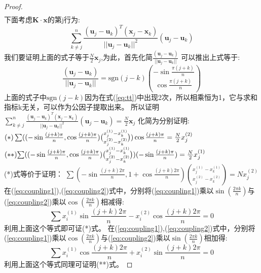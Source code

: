 \begin{proof}
\begin{eqnarray}
\end{eqnarray}
下面考虑$\bm{K}\cdot \bm{x}$的第j行为:
\begin{equation}\label{eq:tt}
\sum_{k\neq j}^n \frac{(\bm{u}_j-\bm{u}_k)^T(\bm{x}_j-\bm{x}_k)}{||\bm{u}_j-\bm{u}_k||^2}(\bm{u}_j-\bm{u}_k)
\end{equation}
我们要证明上面的式子等于$\frac{N}{2}\bm{x}_j$,为此，首先化简$\frac{(\bm{u}_j-\bm{u}_k)}{||\bm{u}_j-\bm{u}_k||}$
可以推出上式等于:
\begin{equation}
\frac{(\bm{u}_j-\bm{u}_k)}{||\bm{u}_j-\bm{u}_k||}=\text{sgn}(j-k)\binom{-\sin\frac{\pi(j+k)}{n}}{\cos\frac{\pi(j+k)}{n}}
\end{equation}
上面的式子中$\text{sgn}(j-k)$因为在式(\ref{eq:tt})中出现2次，所以相乘恒为1，它与求和指标k无关，可以作为公因子提取出来。
所以证明
$\sum_{k\neq j}^n \frac{(\bm{u}_j-\bm{u}_k)^T(\bm{x}_j-\bm{x}_k)}{||\bm{u}_j-\bm{u}_k||^2}(\bm{u}_j-\bm{u}_k)=\frac{N}{2}\bm{x}_j
$
化简为分别证明:
$\scriptsize{
(*)\sum ((-\sin\frac{(j+k)\pi}{n},\cos\frac{(j+k)\pi}{n})\binom{x_j^{(1)}-x_k^{(1)}}{x_j^{(2)}-x_k^{(2)}})
\cos\frac{(j+k)\pi}{n}=\frac{N}{2}x_j^{(2)}}$
$(**)\scriptsize{\sum ((-\sin\frac{(j+k)\pi}{n},\cos\frac{(j+k)\pi}{n})\binom{x_j^{(1)}-x_k^{(1)}}{x_j^{(2)}-x_k^{(2)}})
(-\sin\frac{(j+k)\pi}{n})=\frac{N}{2}x_j^{(1)}}$\\
(*)式等价于证明：
$\sum (-\sin\frac{(j+k)2\pi}{n},1+\cos\frac{(j+k)2\pi}{n})\binom{x_j^{(1)}-x_k^{(1)}}{x_j^{(2)}-x_k^{(2)}}=Nx_j^{(2)}
$
在(\ref{eq:coupling1}),(\ref{eq:coupling2})式中，分别将(\ref{eq:coupling1})乘以$\sin(\frac{2\pi k}{n})$与(\ref{eq:coupling2})乘以$\cos(\frac{2\pi k}{n})$相减得:
\begin{equation}
\sum x_i^{(1)}\sin\frac{(j+k)2\pi}{n}-x_i^{(2)}\cos\frac{(j+k)2\pi}{n}=0
\end{equation}
利用上面这个等式即可证(*)式。
在(\ref{eq:coupling1}),(\ref{eq:coupling2})式中，分别将(\ref{eq:coupling1})乘以$\cos(\frac{2\pi k}{n})$与(\ref{eq:coupling2})乘以$\sin(\frac{2\pi k}{n})$相加得:
\begin{equation}
\sum x_i^{(1)}\cos\frac{(j+k)2\pi}{n}+x_i^{(2)}\sin\frac{(j+k)2\pi}{n}=0
\end{equation}
利用上面这个等式同理可证明(**)式。
\end{proof}
